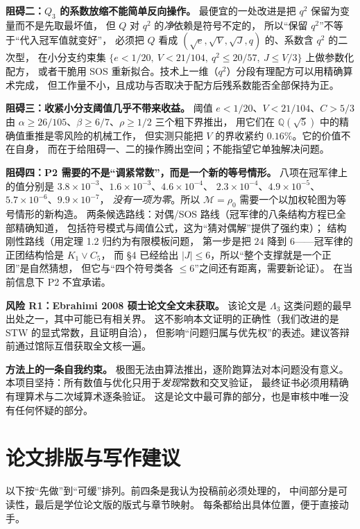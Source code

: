 \documentclass[UTF8,11pt]{ctexart}
\newcommand{\Lam}{\Lambda}
\newcommand{\M}{\mathcal{M}}
\begin{document}
\textbf{阻碍二：$Q_3$ 的系数放缩不能简单反向操作。}
最便宜的一处改进是把 $q^2$ 保留为变量而不是先取最坏值，
但 $Q$ 对 $q^2$ 的\emph{净}依赖是符号不定的，
所以``保留 $q^2$''不等于``代入冠军值就变好''，
必须把 $Q$ 看成 $(\sqrt e,\sqrt V,\sqrt J,q)$ 的、系数含 $q^2$ 的二次型，
在小分支约束集 $\{e<1/20,\ V<21/104,\ q^2\le20/57,\ J\le V/3\}$ 上做参数化配方，
或者干脆用 SOS 重新拟合。技术上一维（$q^2$）分段有理配方可以用精确算术完成，
但工作量不小，且成功与否取决于配方后残系数能否全部保持为正。

\textbf{阻碍三：收紧小分支阈值几乎不带来收益。}
阈值 $e<1/20$、$V<21/104$、$C>5/3$ 由 $\alpha\ge26/105$、$\beta\ge6/7$、$\rho\ge1/2$ 三个粗下界推出，
用它们在 $\mathbb Q(\sqrt5)$ 中的精确值重推是零风险的机械工作，
但实测只能把 $V$ 的界收紧约 $0.16\%$。它的价值不在自身，
而在于给阻碍一、二的操作腾出空间；不能指望它单独解决问题。

\textbf{阻碍四：P2 需要的不是``调紧常数''，而是一个新的等号情形。}
八项在冠军律上的值分别是 $3.8\times10^{-3}$、$1.6\times10^{-3}$、$4.6\times10^{-4}$、
$2.3\times10^{-4}$、$4.9\times10^{-5}$、$5.7\times10^{-6}$、$9.9\times10^{-7}$，
\emph{没有一项为零}。所以 $\M=\rho_0$ 需要一个以加权轮图为等号情形的新构造。
两条候选路线：对偶/SOS 路线（冠军律的八条结构方程已全部精确知道，
包括符号模式与阈值公式，这为``猜对偶解''提供了强约束）；
结构刚性路线（用定理 1.2 归约为有限模板问题，
第一步是把 $24$ 降到 $6$——冠军律的正团结构恰是 $K_1\vee C_5$，
而 \S4 已经给出 $|J|\le6$，所以``整个支撑就是一个正团''是自然猜想，
但它与``四个符号类各 $\le6$''之间还有距离，需要新论证）。
在当前信息下 P2 不宜承诺。

\textbf{风险 R1：Ebrahimi 2008 硕士论文全文未获取。}
该论文是 $\Lam_3$ 这类问题的最早出处之一，其中可能已有相关界。
这不影响本文证明的正确性（我们改进的是 STW 的显式常数，且证明自洽），
但影响``问题归属与优先权''的表述。建议答辩前通过馆际互借获取全文核一遍。

\textbf{方法上的一条自我约束。}
极图无法由算法推出，逐阶跑算法对本问题没有意义。
本项目坚持：所有数值与优化只用于\emph{发现}常数和交叉验证，
最终证书必须用精确有理算术与二次域算术逐条验证。
这是论文中最可靠的部分，也是审核中唯一没有任何怀疑的部分。

\section{论文排版与写作建议}

以下按``先做''到``可缓''排列。前四条是我认为投稿前必须处理的，
中间部分是可读性，最后是学位论文版的版式与章节映射。
每条都给出具体位置，便于直接动手。
\end{document}
